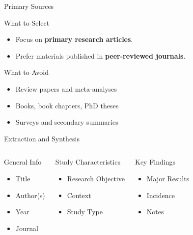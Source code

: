 \begin{frame}{Primary Sources}
  \begin{block}{What to Select}
    \begin{itemize}
      \item Focus on \textbf{primary research articles}.
        \pause
      \item Prefer materials published in \textbf{peer-reviewed journals}.
    \end{itemize}
  \end{block}

  \vspace{0.5cm}
  \pause

  \begin{block}{What to Avoid}
    \begin{itemize}
      \item Review papers and meta-analyses
        \pause
      \item Books, book chapters, PhD theses
        \pause
      \item Surveys and secondary summaries
    \end{itemize}
  \end{block}
\end{frame}

\begin{frame}{Extraction and Synthesis}
  \begin{columns}[T]
    \begin{block}{General Info}
      \begin{itemize}
        \item Title
        \item Author(s)
        \item Year
        \item Journal
      \end{itemize}
    \end{block}
    \pause

    \begin{block}{Study Characteristics}
      \begin{itemize}
        \item Research Objective
        \item Context
        \item Study Type
      \end{itemize}
    \end{block}
    \pause

    \begin{block}{Key Findings}
      \begin{itemize}
        \item Major Results
        \item Incidence
        \item Notes
      \end{itemize}
    \end{block}
  \end{columns}
\end{frame}


